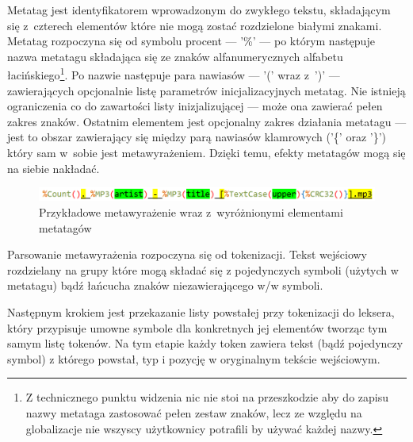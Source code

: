 \par
Metatag jest identyfikatorem wprowadzonym do zwykłego tekstu, składającym się z~czterech elementów które nie mogą zostać rozdzielone białymi znakami. Metatag rozpoczyna się od symbolu procent --- '\%' --- po którym następuje nazwa metatagu składająca się ze znaków alfanumerycznych alfabetu łacińskiego\footnote{Z technicznego punktu widzenia nic nie stoi na przeszkodzie aby do zapisu nazwy metataga zastosować pełen zestaw znaków, lecz ze względu na globalizacje nie wszyscy użytkownicy potrafili by używać każdej nazwy.}.
Po nazwie następuje para nawiasów --- '(' wraz z~')' --- zawierających opcjonalnie listę parametrów inicjalizacyjnych metatag. Nie istnieją ograniczenia co do zawartości listy inizjalizującej --- może ona zawierać pełen zakres znaków.
Ostatnim elementem jest opcjonalny zakres działania metatagu --- jest to obszar zawierający się między parą nawiasów klamrowych ('\{' oraz '\}') który sam w~sobie jest metawyrażeniem. Dzięki temu, efekty metatagów mogą się na siebie nakładać.

\begin{figure}[h]
\begin{center}
\includegraphics[scale=0.55]{img/metatag_expr2.png}
\end{center}
\caption{Przykładowe metawyrażenie wraz z~wyróżnionymi elementami metatagów}
\label{metatag-expr}
\end{figure}

\par
Parsowanie metawyrażenia rozpoczyna się od tokenizacji. Tekst wejściowy rozdzielany na grupy które mogą składać się z pojedynczych symboli (użytych w metatagu) bądź łańcucha znaków niezawierającego w/w symboli.

\par
Następnym krokiem jest przekazanie listy powstałej przy tokenizacji do leksera, który przypisuje umowne symbole dla konkretnych jej elementów tworząc tym samym listę tokenów. Na tym etapie każdy token zawiera tekst (bądź pojedynczy symbol) z którego powstał, typ i pozycję w oryginalnym tekście wejściowym.

